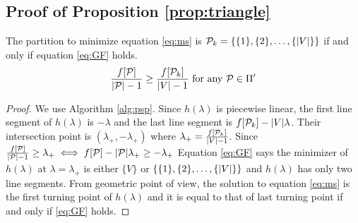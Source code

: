 \subsection{Proof of Proposition \ref{prop:triangle}}
\begin{lemma}\label{lem:trival}
	The partition to minimize equation \eqref{eq:ms} is $\mathcal{P}_k = \{\{1\},\{2\},\dots,\{\lvert V\rvert\}\}$ if and only if equation \eqref{eq:GF} holds.
	\begin{equation}\label{eq:GF}
	\frac{f[\mathcal{P}]}{\lvert\mathcal{P}\rvert-1} \geq \frac{f[\mathcal{P}_k]}{\lvert V\rvert-1} \textrm{ for any } \mathcal{P} \in \Pi'
	\end{equation}
\end{lemma}
\begin{proof}
	We use Algorithm \ref{alg:psp}. Since $h(\lambda)$ is piecewise linear, the first line segment of $h(\lambda)$ is $ - \lambda $ and the last line segment is $ f[\mathcal{P}_k] - \lvert V\rvert \lambda$. Their intersection point is $(\lambda_{+}, -\lambda_{+})$ where $\lambda_{+} = \frac{f[\mathcal{P}_k]}{\lvert V\rvert-1}$. Since $\frac{f[\mathcal{P}]}{\lvert\mathcal{P}\rvert-1} \geq \lambda_{+} \iff f[\mathcal{P}] - \lvert\mathcal{P}\rvert\lambda_{+} \geq - \lambda_{+}$ Equation \eqref{eq:GF} says the minimizer of $h(\lambda)$ at $\lambda = \lambda_{+}$ is either $\{V\}$ or $\{\{1\},\{2\},\dots,\{\lvert V\rvert\}\}$ and $h(\lambda)$ has only two line segments. From geometric point of view, the solution to equation \eqref{eq:ms} is the first turning point of $h(\lambda)$ and it is equal to that of last turning point if and only if \eqref{eq:GF} holds.
\end{proof}

